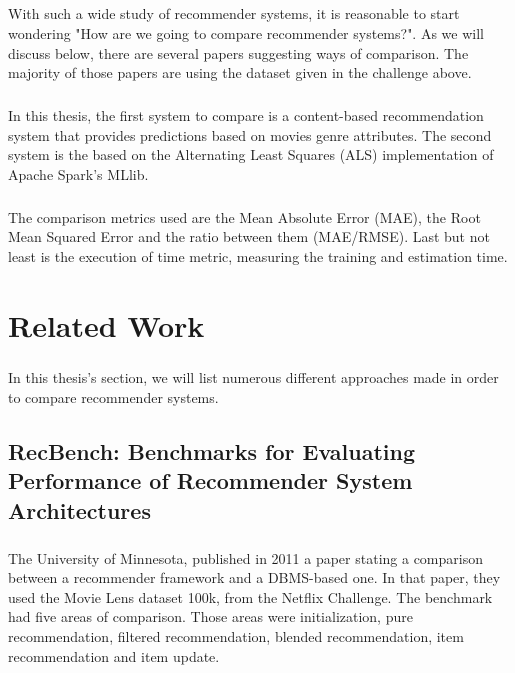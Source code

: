 \paragraph{} With such a wide study of recommender systems, it is reasonable to start wondering "How are we going to compare recommender systems?". As we will discuss below, there are several papers suggesting ways of comparison. The majority of those papers are using the dataset given in the challenge above.

\paragraph{} In this thesis, the first system to compare is a content-based recommendation system that provides predictions based on movies genre attributes. The second system is the based on the Alternating Least Squares (ALS) implementation of Apache Spark's MLlib.

\paragraph{} The comparison metrics used are the Mean Absolute Error (MAE), the Root Mean Squared Error and the ratio between them (MAE/RMSE). Last but not least is the execution of time metric, measuring the training and estimation time.

\chapter{Related Work}
\paragraph{} In this thesis's section, we will list numerous different approaches made in order to compare recommender systems.

\section{RecBench: Benchmarks for Evaluating Performance of Recommender System Architectures \cite{levandoski2011recbench}}
\paragraph{} The University of Minnesota, published in 2011 a paper stating a comparison between a recommender framework and a DBMS-based one. In that paper, they used the Movie Lens dataset 100k, from the Netflix Challenge. The benchmark had five areas of comparison. Those areas were initialization, pure recommendation, filtered recommendation, blended recommendation, item recommendation and item update.

